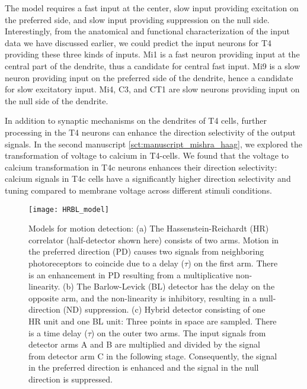The model requires a fast input at the center, slow input providing excitation on the preferred side, and slow input providing suppression on the null side. Interestingly, from the anatomical and functional characterization of the input data we have discussed earlier, we could predict the input neurons for T4 providing these three kinds of inputs. Mi1 is a fast neuron providing input at the central part of the dendrite, thus a candidate for central fast input. Mi9 is a slow neuron providing input on the preferred side of the dendrite, hence a candidate for slow excitatory input. Mi4, C3, and CT1 are slow neurons providing input on the null side of the dendrite. 

In addition to synaptic mechanisms on the dendrites of T4 cells, further processing in the T4 neurons can enhance the direction selectivity of the output signals. %
In the second manuscript \ref{sct:manuscript_mishra_haag}, we explored the transformation of voltage to calcium in T4-cells. We found that the voltage to calcium transformation in T4c neurons enhances their direction selectivity: calcium signals in T4c cells have a significantly higher direction selectivity and tuning compared to membrane voltage across different stimuli conditions. 
\begin{figure}
\centering
\hspace*{-1cm} 
\texttt{[image: HRBL\_model]}
\caption[Models for motion detection] {Models for motion detection: (a) The Hassenstein-Reichardt (HR) correlator (half-detector shown here) consists of two arms. Motion in the preferred direction (PD) causes two signals from neighboring photoreceptors to coincide due to a delay ($\tau$) on the first arm. There is an enhancement in PD resulting from a multiplicative non-linearity. (b) The Barlow-Levick (BL) detector has the delay on the opposite arm, and the non-linearity is inhibitory, resulting in a null-direction (ND) suppression. (c) Hybrid detector consisting of one HR unit and one BL unit: Three points in space are sampled. There is a time delay ($\tau$) on the outer two arms. The input signals from detector arms A and B are multiplied and divided by the signal from detector arm C in the following stage. Consequently, the signal in the preferred direction is enhanced and the signal in the null direction is suppressed.}
\label{fig:hrblmodel}
\end{figure}






